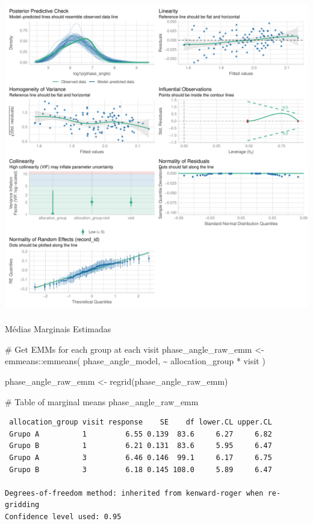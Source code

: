 \documentclass[
  letterpaper,
  DIV=11,
  numbers=noendperiod]{scrartcl}
\makeatletter
\let\oldparagraph\paragraph
\renewcommand{\paragraph}{
    \@ifstar
      \xxxParagraphStar
      \xxxParagraphNoStar
  }
\newcommand{\xxxParagraphStar}[1]{\oldparagraph*{#1}\mbox{}}
\newcommand{\xxxParagraphNoStar}[1]{\oldparagraph{#1}\mbox{}}
\newenvironment{Shaded}{\begin{snugshade}}{\end{snugshade}}
\newcommand{\CommentTok}[1]{\textcolor[rgb]{0.37,0.37,0.37}{#1}}
\newcommand{\FunctionTok}[1]{\textcolor[rgb]{0.28,0.35,0.67}{#1}}
\newcommand{\NormalTok}[1]{\textcolor[rgb]{0.00,0.23,0.31}{#1}}
\newcommand{\OtherTok}[1]{\textcolor[rgb]{0.00,0.23,0.31}{#1}}
\newcommand{\SpecialCharTok}[1]{\textcolor[rgb]{0.37,0.37,0.37}{#1}}
\makeatother
\begin{document}
\includegraphics{Outcomes_V1V2V3_files/figure-pdf/phase_angle_4-2.pdf}

\paragraph{Médias Marginais
Estimadas}\label{muxe9dias-marginais-estimadas-17}

\begin{Shaded}
\begin{Highlighting}[]
\CommentTok{\# Get EMMs for each group at each visit}
\NormalTok{phase\_angle\_raw\_emm }\OtherTok{\textless{}{-}}\NormalTok{ emmeans}\SpecialCharTok{::}\FunctionTok{emmeans}\NormalTok{(}
\NormalTok{    phase\_angle\_model, }
    \SpecialCharTok{\textasciitilde{}}\NormalTok{ allocation\_group }\SpecialCharTok{*}\NormalTok{ visit}
\NormalTok{)}

\NormalTok{phase\_angle\_raw\_emm }\OtherTok{\textless{}{-}} \FunctionTok{regrid}\NormalTok{(phase\_angle\_raw\_emm)}

\CommentTok{\# Table of marginal means}
\NormalTok{phase\_angle\_raw\_emm}
\end{Highlighting}
\end{Shaded}

\begin{verbatim}
 allocation_group visit response    SE    df lower.CL upper.CL
 Grupo A          1         6.55 0.139  83.6     6.27     6.82
 Grupo B          1         6.21 0.131  83.6     5.95     6.47
 Grupo A          3         6.46 0.146  99.1     6.17     6.75
 Grupo B          3         6.18 0.145 108.0     5.89     6.47

Degrees-of-freedom method: inherited from kenward-roger when re-gridding 
Confidence level used: 0.95 
\end{verbatim}
\end{document}
